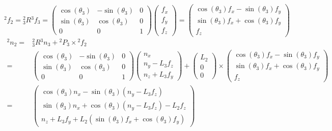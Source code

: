 \documentclass[10pt,a4paper]{article}
\begin{document}
\begin{equation*}
  {}^{2}f_{2} = {}_{3}^{2}R {}^{3}f_{3} = \begin{pmatrix}
    \cos(\theta_{3}) & -\sin(\theta_{3}) & 0\\
    \sin(\theta_{3}) & \cos(\theta_{3}) & 0\\
    0 & 0 & 1
  \end{pmatrix} \begin{pmatrix}
    f_{x}\\f_{y}\\f_{z}
  \end{pmatrix} = \begin{pmatrix}
    \cos(\theta_{3})f_{x} - \sin(\theta_{3})f_{y}\\
    \sin(\theta_{3})f_{x} + \cos(\theta_{3})f_{y}\\
    f_{z}
  \end{pmatrix}
\end{equation*}
\begin{align*}
  {}^{2}n_{2} = & {}_{3}^{2}R {}^{3}n_{3} + {}^{2}P_{3} \times {}^{2}f_{2}\\
  = & \begin{pmatrix}
    \cos(\theta_{3}) & -\sin(\theta_{3}) & 0\\
    \sin(\theta_{3}) & \cos(\theta_{3}) & 0\\
    0 & 0 & 1
  \end{pmatrix} \begin{pmatrix}
    n_{x}\\
    n_{y} - L_{3}f_{z}\\
    n_{z} + L_{3}f_{y}
  \end{pmatrix} + \begin{pmatrix}
    L_{2}\\0\\0
  \end{pmatrix} \times \begin{pmatrix}
    \cos(\theta_{3})f_{x} - \sin(\theta_{3})f_{y}\\
    \sin(\theta_{3})f_{x} + \cos(\theta_{3})f_{y}\\
    f_{z}
  \end{pmatrix}\\
  = & \begin{pmatrix}
    \cos(\theta_{3})n_{x} - \sin(\theta_{3})(n_{y} - L_{3}f_{z})\\
    \sin(\theta_{3})n_{x} + \cos(\theta_{3})(n_{y} - L_{3}f_{z}) - L_{2}f_{z}\\
    n_{z} + L_{3}f_{y} + L_{2}(\sin(\theta_{3})f_{x} + \cos(\theta_{3})f_{y})
  \end{pmatrix}
\end{align*}
\end{document}
